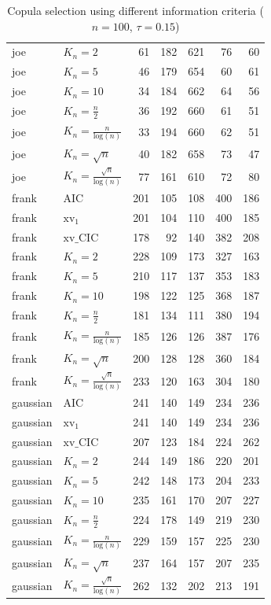 \begin{table}[htbp]
\begin{tabular}{llrrrrr}
  joe & $K_{n}=2$ & 61 & 182 & 621 & 76 & 60 \\ 
  joe & $K_{n}=5$ & 46 & 179 & 654 & 60 & 61 \\ 
  joe & $K_{n}=10$ & 34 & 184 & 662 & 64 & 56 \\ 
  joe & $K_{n}=\tfrac{n}{2}$ & 36 & 192 & 660 & 61 & 51 \\ 
  joe & $K_{n}=\tfrac{n}{\text{log}(n)}$ & 33 & 194 & 660 & 62 & 51 \\ 
  joe & $K_{n}=\sqrt{n}$ & 40 & 182 & 658 & 73 & 47 \\ 
  joe & $K_{n}=\tfrac{\sqrt{n}}{\text{log}(n)}$ & 77 & 161 & 610 & 72 & 80 \\ 
   \hdashline
frank & AIC & 201 & 105 & 108 & 400 & 186 \\ 
  frank & $\text{xv}_{1}$ & 201 & 104 & 110 & 400 & 185 \\ 
  frank & $\text{xv}\_\text{CIC}$ & 178 & 92 & 140 & 382 & 208 \\ 
  frank & $K_{n}=2$ & 228 & 109 & 173 & 327 & 163 \\ 
  frank & $K_{n}=5$ & 210 & 117 & 137 & 353 & 183 \\ 
  frank & $K_{n}=10$ & 198 & 122 & 125 & 368 & 187 \\ 
  frank & $K_{n}=\tfrac{n}{2}$ & 181 & 134 & 111 & 380 & 194 \\ 
  frank & $K_{n}=\tfrac{n}{\text{log}(n)}$ & 185 & 126 & 126 & 387 & 176 \\ 
  frank & $K_{n}=\sqrt{n}$ & 200 & 128 & 128 & 360 & 184 \\ 
  frank & $K_{n}=\tfrac{\sqrt{n}}{\text{log}(n)}$ & 233 & 120 & 163 & 304 & 180 \\ 
   \hdashline
gaussian & AIC & 241 & 140 & 149 & 234 & 236 \\ 
  gaussian & $\text{xv}_{1}$ & 241 & 140 & 149 & 234 & 236 \\ 
  gaussian & $\text{xv}\_\text{CIC}$ & 207 & 123 & 184 & 224 & 262 \\ 
  gaussian & $K_{n}=2$ & 244 & 149 & 186 & 220 & 201 \\ 
  gaussian & $K_{n}=5$ & 242 & 148 & 173 & 204 & 233 \\ 
  gaussian & $K_{n}=10$ & 235 & 161 & 170 & 207 & 227 \\ 
  gaussian & $K_{n}=\tfrac{n}{2}$ & 224 & 178 & 149 & 219 & 230 \\ 
  gaussian & $K_{n}=\tfrac{n}{\text{log}(n)}$ & 229 & 159 & 157 & 225 & 230 \\ 
  gaussian & $K_{n}=\sqrt{n}$ & 237 & 164 & 157 & 207 & 235 \\ 
  gaussian & $K_{n}=\tfrac{\sqrt{n}}{\text{log}(n)}$ & 262 & 132 & 202 & 213 & 191 \\ 
   \hline
\end{tabular}
\caption{Copula selection using different information criteria ($n = 100$, $\tau = 0.15$)} 
\end{table}


